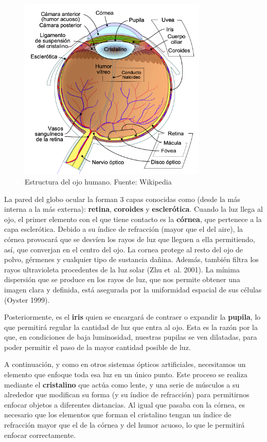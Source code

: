 \documentclass[
  12pt,
  spanish,
  a4paperpaper,
]{report}
\begin{document}
\begin{figure}
\centering
\includegraphics[width=0.8\textwidth,height=\textheight]{source/figures/human-eye.png}
\caption{Estructura del ojo humano. Fuente: Wikipedia \label{ojohumano}}
\end{figure}

La pared del globo ocular la forman 3 capas conocidas como (desde la más
interna a la más externa): \textbf{retina}, \textbf{coroides} y
\textbf{esclerótica}. Cuando la luz llega al ojo, el primer elemento con
el que tiene contacto es la \textbf{córnea}, que pertenece a la capa
esclerótica. Debido a su índice de refracción (mayor que el del aire),
la córnea provocará que se desvíen los rayos de luz que lleguen a ella
permitiendo, así, que converjan en el centro del ojo. La cornea protege
al resto del ojo de polvo, gérmenes y cualquier tipo de sustancia
dañina. Además, también filtra los rayos ultravioleta procedentes de la
luz solar (Zhu et~al. 2001). La mínima dispersión que se produce en los
rayos de luz, que nos permite obtener una imagen clara y definida, está
asegurada por la uniformidad espacial de sus células (Oyster 1999).

Posteriormente, es el \textbf{iris} quien se encargará de contraer o
expandir la \textbf{pupila}, lo que permitirá regular la cantidad de luz
que entra al ojo. Esta es la razón por la que, en condiciones de baja
luminosidad, nuestras pupilas se ven dilatadas, para poder permitir el
paso de la mayor cantidad posible de luz.

A continuación, y como en otros sistemas ópticos artificiales,
necesitamos un elemento que enfoque toda esa luz en un único punto. Este
proceso se realiza mediante el \textbf{cristalino} que actúa como lente,
y una serie de músculos a su alrededor que modifican su forma (y su
índice de refracción) para permitirnos enfocar objetos a diferentes
distancias. Al igual que pasaba con la córnea, es necesario que los
elementos que forman el cristalino tengan un índice de refracción mayor
que el de la córnea y del humor acuoso, lo que le permitirá enfocar
correctamente.
\end{document}
